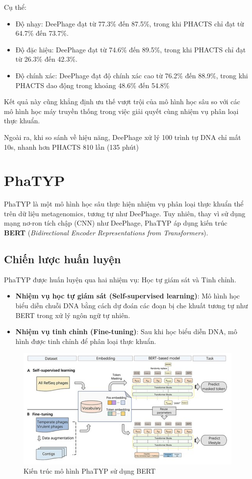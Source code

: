 Cụ thể:
\begin{itemize}
    \item Độ nhạy: DeePhage đạt từ 77.3\% đến 87.5\%, trong khi PHACTS chỉ đạt từ 64.7\% đến 73.7\%. 
    \item Độ đặc hiệu: DeePhage đạt từ 74.6\% đến 89.5\%, trong khi PHACTS chỉ đạt từ 26.3\% đến 42.3\%.
    \item Độ chính xác: DeePhage đạt độ chính xác cao từ 76.2\% đến 88.9\%, trong khi PHACTS dao động trong khoảng 48.6\% đến 54.8\%
\end{itemize}

Kết quả này cũng khẳng định ưu thế vượt trội của mô hình học sâu so với các mô hình học máy truyền thống trong việc giải quyết cùng nhiệm vụ phân loại thực khuẩn.

Ngoài ra, khi so sánh về hiệu năng, DeePhage xử lý 100 trình tự DNA chỉ mất 10s, nhanh hơn PHACTS 810 lần (135 phút)

\section{PhaTYP}

PhaTYP\cite{shang2023phatyp} là một mô hình học sâu thực hiện nhiệm vụ phân loại thực khuẩn thể trên dữ liệu metagenomics, tương tự như DeePhage. Tuy nhiên, thay vì sử dụng mạng nơ-ron tích chập (CNN) như DeePhage, PhaTYP áp dụng kiến trúc \textbf{BERT} (\textit{Bidirectional Encoder Representations from Transformers}). 

\subsection*{Chiến lược huấn luyện}

PhaTYP được huấn luyện qua hai nhiệm vụ: Học tự giám sát và Tinh chỉnh. 
\begin{itemize}
    \item \textbf{Nhiệm vụ học tự giám sát (Self-supervised learning)}: Mô hình học biểu diễn chuỗi DNA bằng cách dự đoán các đoạn bị che khuất tương tự như BERT trong xử lý ngôn ngữ tự nhiên.
    \item \textbf{Nhiệm vụ tinh chỉnh (Fine-tuning)}: Sau khi học biểu diễn DNA, mô hình được tinh chỉnh để phân loại thực khuẩn.
\end{itemize}
\begin{figure}[H]
    \centering
    \includegraphics[width=1\linewidth]{figures/PhaTYP_Model.png}
    \caption{Kiến trúc mô hình PhaTYP sử dụng BERT}
    \label{fig:enter-label}
\end{figure}


